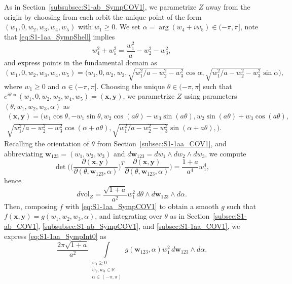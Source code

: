 \documentclass[twoside]{amsart}
\theoremstyle{definition}
\theoremstyle{remark}
\numberwithin{equation}{section}
\newcommand{\R}{\mathbb{R}}
\newcommand{\vol}{\text{vol}}
\begin{document}
As in Section~\ref{subsubsec:S1-ab_SympCOV1}, we parametrize $Z$ away from the origin by choosing from each orbit the unique point of the form
$(w_1, 0, w_2, w_3, w_4, w_5)$ with $w_1 \geq 0$. We set $\alpha = \arg (w_4 + i w_5) \in (-\pi, \pi]$, note that \eqref{eq:S1-1aa_SympShell} implies
\[
    w_4^2 + w_5^2   =   \frac{w_1^2}{a} - w_2^2 - w_3^2,
\]
and express points in the fundamental domain as
\begin{equation}
\label{eq:S1-1aa_SympFundDom}
    (w_1, 0, w_2, w_3, w_4, w_5) = \Big( w_1, 0, w_2, w_3, \sqrt{w_1^2/a - w_2^2 - w_3^2}\cos\alpha, \sqrt{w_1^2/a - w_2^2 - w_3^2}\sin\alpha \Big),
\end{equation}
where $w_1 \geq 0$ and $\alpha\in (-\pi, \pi]$.
Choosing the unique $\theta\in(-\pi,\pi]$ such that $e^{i\theta}\ast(w_1, 0, w_2, w_3, w_4, w_5) = (\mathbf{x}, \mathbf{y})$, we parametrize $Z$
using parameters $(\theta,w_1,w_2,w_3,\alpha)$ as
\begin{multline}
\label{eq:S1-1aa_SympCOV1}
    (\mathbf{x}, \mathbf{y})
    =
    \big(   w_1 \cos\theta,
            - w_1 \sin\theta,
            w_2 \cos(a\theta) - w_3 \sin(a\theta),
            w_2 \sin(a\theta) + w_3 \cos(a\theta), \\
            \sqrt{w_1^2/a - w_2^2 - w_3^2}\cos(\alpha + a\theta),
            \sqrt{w_1^2/a - w_2^2 - w_3^2}\sin(\alpha + a\theta),
    \big).
\end{multline}
Recalling the orientation of $\theta$ from Section~\ref{subsec:S1-1aa_COV1}, and abbreviating
$\mathbf{w}_{123} = (w_1, w_2, w_3)$ and $d\mathbf{w}_{123} = dw_1 \wedge dw_2 \wedge dw_3$, we compute
\[
    \det\Bigg(\Big(\frac{\partial (\mathbf{x}, \mathbf{y})}{ \partial (\theta, \mathbf{w}_{123}, \alpha)}\Big)^T
                \frac{\partial (\mathbf{x}, \mathbf{y})}{ \partial (\theta, \mathbf{w}_{123}, \alpha)}\Bigg)
    =
    \frac{1 + a}{a^4} w_1^4,
\]
hence
\begin{equation}
\label{eq:S1-1aa_SympVolFormW}
    d\vol_Z =  \frac{\sqrt{1 + a}}{a^2} w_1^2
                \, d\theta \wedge d\mathbf{w}_{123} \wedge d\alpha.
\end{equation}
Then, composing $f$ with \eqref{eq:S1-1aa_SympCOV1} to obtain a smooth $g$ such that $f(\mathbf{x},\mathbf{y}) = g(w_1,w_2,w_3,\alpha)$,
and integrating over $\theta$ as in Section~\ref{subsec:S1-ab_COV1}, \ref{subsubsec:S1-ab_SympCOV1}, and \ref{subsec:S1-1aa_COV1},
we express \eqref{eq:S1-1aa_SympInt0} as
\begin{equation}
    \label{eq:S1-1aa_SympInt1}
    \frac{2\pi\sqrt{1 + a}}{a^2}  \int\limits_{\substack{w_1 \geq 0 \\ w_2, w_3\in\R \\ \alpha\in(-\pi,\pi)}} g(\mathbf{w}_{123},\alpha)
        w_1^2 \, d\mathbf{w}_{123} \wedge d\alpha.
\end{equation}
\end{document}
